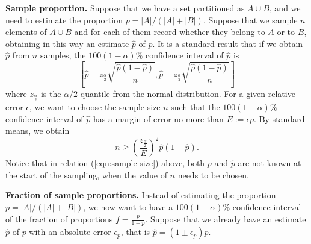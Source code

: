 \documentclass[a4paper,11pt]{article}
\newcommand{\alex}[1]{{\color{blue}{#1}}}
\begin{document}
\textbf{Sample proportion.} Suppose that we have a set partitioned as $A \cup B$, and we need to estimate the proportion $p = |A| / (|A| + |B|)$. Suppose that we sample $n$ elements of $A \cup B$ and for each of them record whether they belong to $A$ or to $B$, obtaining in this way an estimate $\hat{p}$ of $p$. It is a standard result that if we obtain $\hat{p}$ from $n$ samples, the $100(1-\alpha)\%$ confidence interval of $\hat{p}$ is
\[\left[\hat{p} - z_{\frac{\alpha}{2}}\sqrt{\frac{\hat{p}(1-\hat{p})}{n}} , \hat{p} + z_{\frac{\alpha}{2}}\sqrt{\frac{\hat{p}(1-\hat{p})}{n}}\right] \]
where $z_{\frac{\alpha}{2}}$ is the $\alpha/2$ quantile from the normal distribution. For a given relative error $\epsilon$, we want to choose the sample size $n$ such that the $100(1-\alpha)\%$ confidence interval of $\hat{p}$ has a margin of error no more than $E := \epsilon p$. By standard means, we obtain
\begin{equation}
	n \geq \left(\frac{z_{\frac{\alpha}{2}}}{E}\right)^2\hat{p}(1-\hat{p}).
	\label{eqn:sample-size}
\end{equation}
Notice that in relation (\ref{eqn:sample-size}) above, both $p$ and $\hat{p}$ are not known at the start of the sampling, when the value of $n$ needs to be chosen. \alex{In our case, we choose ...  }




\noindent \textbf{Fraction of sample proportions.} Instead of estimating the proportion $p = |A| / (|A| + |B|)$, we now want to have a $100(1-\alpha)\%$ confidence interval of the fraction of proportions $f =\frac{p}{1-p}$.
Suppose that we already have an estimate $\hat{p}$ of $p$ with an absolute error $\epsilon_p$, that is $\hat{p} = (1 \pm \epsilon_p)p$. 
\end{document}
